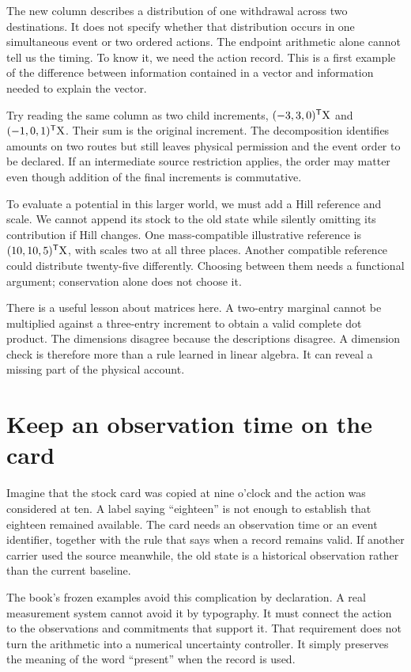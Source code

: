 The new column describes a distribution of one withdrawal across two destinations. It does not specify whether that distribution occurs in one simultaneous event or two ordered actions. The endpoint arithmetic alone cannot tell us the timing. To know it, we need the action record. This is a first example of the difference between information contained in a vector and information needed to explain the vector.

Try reading the same column as two child increments, \((-3,3,0)^{\mathsf T}\mathrm{X}\) and \((-1,0,1)^{\mathsf T}\mathrm{X}\). Their sum is the original increment. The decomposition identifies amounts on two routes but still leaves physical permission and the event order to be declared. If an intermediate source restriction applies, the order may matter even though addition of the final increments is commutative.

To evaluate a potential in this larger world, we must add a Hill reference and scale. We cannot append its stock to the old state while silently omitting its contribution if Hill changes. One mass-compatible illustrative reference is \((10,10,5)^{\mathsf T}\mathrm{X}\), with scales two at all three places. Another compatible reference could distribute twenty-five differently. Choosing between them needs a functional argument; conservation alone does not choose it.

There is a useful lesson about matrices here. A two-entry marginal cannot be multiplied against a three-entry increment to obtain a valid complete dot product. The dimensions disagree because the descriptions disagree. A dimension check is therefore more than a rule learned in linear algebra. It can reveal a missing part of the physical account.

\section{Keep an observation time on the card}

Imagine that the stock card was copied at nine o'clock and the action was considered at ten. A label saying ``eighteen'' is not enough to establish that eighteen remained available. The card needs an observation time or an event identifier, together with the rule that says when a record remains valid. If another carrier used the source meanwhile, the old state is a historical observation rather than the current baseline.

The book's frozen examples avoid this complication by declaration. A real measurement system cannot avoid it by typography. It must connect the action to the observations and commitments that support it. That requirement does not turn the arithmetic into a numerical uncertainty controller. It simply preserves the meaning of the word ``present'' when the record is used.


